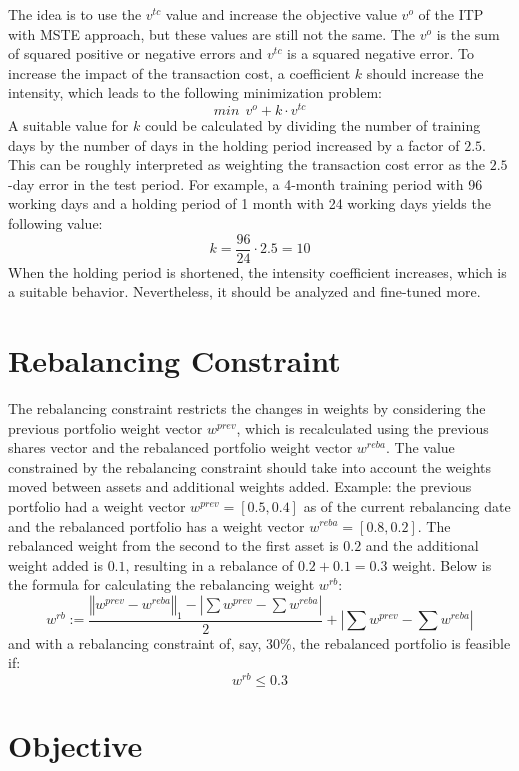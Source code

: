 \documentclass[
  oneside]{book}
\begin{document}
The idea is to use the \(v^{tc}\) value and increase the objective value \(v^o\) of the ITP with MSTE approach, but these values are still not the same. The \(v^o\) is the sum of squared positive or negative errors and \(v^{tc}\) is a squared negative error. To increase the impact of the transaction cost, a coefficient \(k\) should increase the intensity, which leads to the following minimization problem:
\[
  min \ \  v^o + k \cdot v^{tc}
\]
A suitable value for \(k\) could be calculated by dividing the number of training days by the number of days in the holding period increased by a factor of \(2.5\). This can be roughly interpreted as weighting the transaction cost error as the \(2.5\)-day error in the test period. For example, a 4-month training period with 96 working days and a holding period of 1 month with 24 working days yields the following value:
\[
  k = \frac{96}{24} \cdot 2.5 = 10
\]
When the holding period is shortened, the intensity coefficient increases, which is a suitable behavior. Nevertheless, it should be analyzed and fine-tuned more.

\hypertarget{rebalancing-constraint}{%
\section{Rebalancing Constraint}\label{rebalancing-constraint}}

The rebalancing constraint restricts the changes in weights by considering the previous portfolio weight vector \(w^{prev}\), which is recalculated using the previous shares vector and the rebalanced portfolio weight vector \(w^{reba}\). The value constrained by the rebalancing constraint should take into account the weights moved between assets and additional weights added. Example: the previous portfolio had a weight vector \(w^{prev} = [0.5, 0.4]\) as of the current rebalancing date and the rebalanced portfolio has a weight vector \(w^{reba} = [0.8, 0.2]\). The rebalanced weight from the second to the first asset is \(0.2\) and the additional weight added is \(0.1\), resulting in a rebalance of \(0.2+0.1=0.3\) weight. Below is the formula for calculating the rebalancing weight \(w^{rb}\):
\[
  w^{rb} := \frac{\left\Vert w^{prev}-w^{reba} \right\Vert_1 - |\sum w^{prev} - \sum w^{reba}|}{2}+|\sum w^{prev} - \sum w^{reba}|
\]
and with a rebalancing constraint of, say, 30\%, the rebalanced portfolio is feasible if:
\[
  w^{rb} \leq 0.3
\]

\hypertarget{objective}{%
\section{Objective}\label{objective}}
\end{document}
